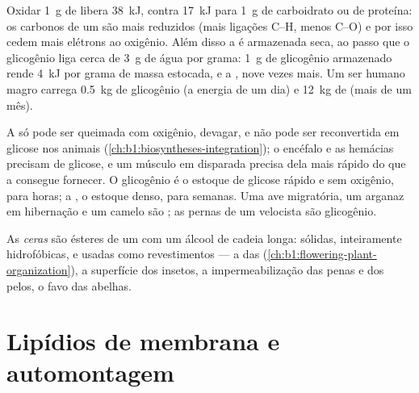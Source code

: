 \begin{proposition}\label{prop:b1:lipids:energystore}
Oxidar \qty{1}{g} de  libera \qty{38}{kJ}, contra \qty{17}{kJ}
para \qty{1}{g} de carboidrato ou de proteína: os carbonos de um  são mais reduzidos (mais ligações C--H, menos C--O) e por isso
cedem mais elétrons ao oxigênio. Além disso a  é armazenada seca,
ao passo que o glicogênio liga cerca de \qty{3}{g} de água por grama:
\qty{1}{g} de glicogênio armazenado rende \qty{4}{kJ} por grama de massa
estocada, e a , nove vezes mais. Um ser humano magro carrega
\qty{0.5}{kg} de glicogênio (a energia de um dia) e \qty{12}{kg} de
 (mais de um mês).
\end{proposition}

\begin{example}\label{ex:b1:lipids:whyglycogen}
A  só pode ser queimada com oxigênio, devagar, e não pode ser
reconvertida em glicose nos animais
(\cref{ch:b1:biosyntheses-integration}); o encéfalo e as hemácias
precisam de glicose, e um músculo em disparada precisa dela mais rápido
do que a  consegue fornecer. O glicogênio é o estoque de glicose
rápido e sem oxigênio, para horas; a , o estoque denso, para
semanas. Uma ave migratória, um arganaz em hibernação e um camelo são
; as pernas de um velocista são glicogênio.
\end{example}

\begin{definition}[Ceras]\label{def:b1:lipids:wax}
As \emph{ceras} são ésteres de um  com um álcool
de cadeia longa: sólidas, inteiramente hidrofóbicas, e usadas como
revestimentos --- a  das 
(\cref{ch:b1:flowering-plant-organization}), a superfície dos insetos, a
impermeabilização das penas e dos pelos, o favo das abelhas.
\end{definition}

\section{Lipídios de membrana e automontagem}

